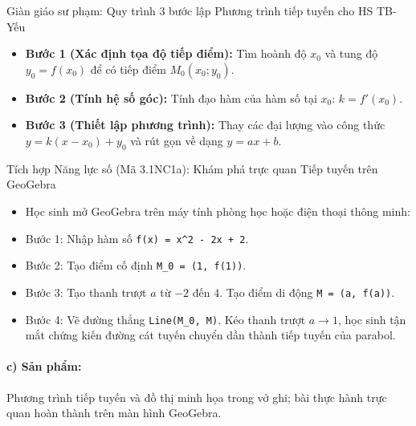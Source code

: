 \documentclass[12pt, a4paper]{article}
\begin{document}
\begin{scaffoldbox}{Giàn giáo sư phạm: Quy trình 3 bước lập Phương trình tiếp tuyến cho HS TB-Yếu}
\begin{itemize}[leftmargin=0.5cm]
    \item \textbf{Bước 1 (Xác định tọa độ tiếp điểm):} Tìm hoành độ $x_0$ và tung độ $y_0 = f(x_0)$ để có tiếp điểm $M_0(x_0; y_0)$.
    \item \textbf{Bước 2 (Tính hệ số góc):} Tính đạo hàm của hàm số tại $x_0$: $k = f'(x_0)$.
    \item \textbf{Bước 3 (Thiết lập phương trình):} Thay các đại lượng vào công thức $y = k(x - x_0) + y_0$ và rút gọn về dạng $y = ax + b$.
\end{itemize}
\end{scaffoldbox}

\begin{scaffoldbox}{Tích hợp Năng lực số (Mã 3.1NC1a): Khám phá trực quan Tiếp tuyến trên GeoGebra}
\begin{itemize}[leftmargin=0.5cm]
    \item Học sinh mở GeoGebra trên máy tính phòng học hoặc điện thoại thông minh:
    \item Bước 1: Nhập hàm số \texttt{f(x) = x\textasciicircum 2 - 2x + 2}.
    \item Bước 2: Tạo điểm cố định \texttt{M\_0 = (1, f(1))}.
    \item Bước 3: Tạo thanh trượt $a$ từ $-2$ đến $4$. Tạo điểm di động \texttt{M = (a, f(a))}.
    \item Bước 4: Vẽ đường thẳng \texttt{Line(M\_0, M)}. Kéo thanh trượt $a \to 1$, học sinh tận mắt chứng kiến đường cát tuyến chuyển dần thành tiếp tuyến của parabol.
\end{itemize}
\end{scaffoldbox}

\paragraph{c) Sản phẩm:} Phương trình tiếp tuyến và đồ thị minh họa trong vở ghi; bài thực hành trực quan hoàn thành trên màn hình GeoGebra.
\end{document}
